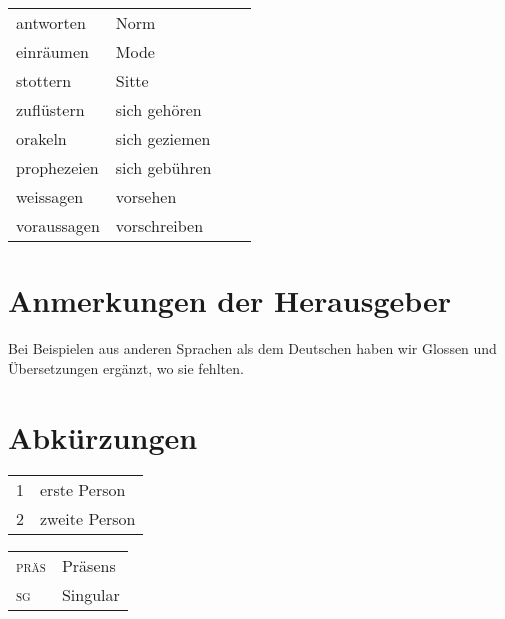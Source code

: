 \documentclass[output=paper, colorlinks, citecolor=brown, booklanguage=german]{langscibook}
\begin{document}
\begin{otherlanguage}{german}
\begin{longtable}{llll}
    antworten & Norm & {} & {} \\
    einräumen & Mode & {} & {} \\
    stottern & Sitte & {} & {} \\
    zuflüstern & sich gehören & {} & {} \\
    orakeln & sich geziemen & {} & {} \\
    prophezeien & sich gebühren & {} & {} \\
    weissagen & vorsehen & {} & {} \\
    voraussagen & vorschreiben & {} & {} \\
\end{longtable}

\section*{Anmerkungen der Herausgeber}
Bei Beispielen aus anderen Sprachen als dem Deutschen haben wir Glossen und Übersetzungen ergänzt, wo sie fehlten.

\section*{Abkürzungen}
\begin{tabularx}{.5\textwidth}{@{}lQ}
\textsc{1}&erste Person\\
\textsc{2}&zweite Person\\
\end{tabularx}%
\begin{tabularx}{.5\textwidth}{lQ@{}}
\textsc{präs}&Präsens\\
\textsc{sg}&Singular\\
\end{tabularx}

\printbibliography[heading=subbibliography,notkeyword=this]
\end{otherlanguage}
\end{document}
